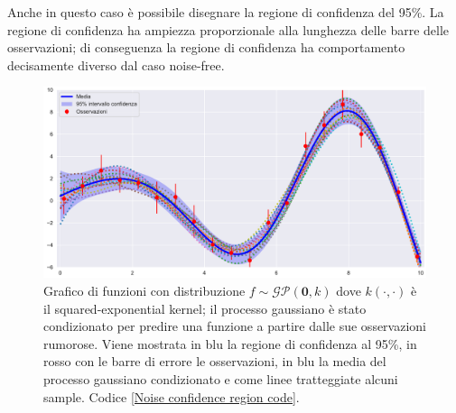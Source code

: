 Anche in questo caso è possibile disegnare la regione di confidenza del 95\%. La regione di confidenza ha ampiezza proporzionale alla lunghezza delle barre delle osservazioni; di conseguenza la regione di confidenza ha comportamento decisamente diverso dal caso noise-free.

\begin{figure}[h]
    \centering
    \includegraphics[width=1\textwidth]{images/Gaussian process/Noise - mean&samples.pdf}
    \caption{Grafico di funzioni con distribuzione $f\sim \mathcal{GP}(\bm{0},k)$ dove $k(\cdot,\cdot)$ è il squared-exponential kernel; il processo gaussiano è stato condizionato per predire una funzione a partire dalle sue osservazioni rumorose. Viene mostrata in blu la regione di confidenza al 95\%, in rosso con le barre di errore le osservazioni, in blu la media del processo gaussiano condizionato e come linee tratteggiate alcuni sample. Codice \ref{Noise confidence region code}.}
    \label{Noisy confidence region}
\end{figure}